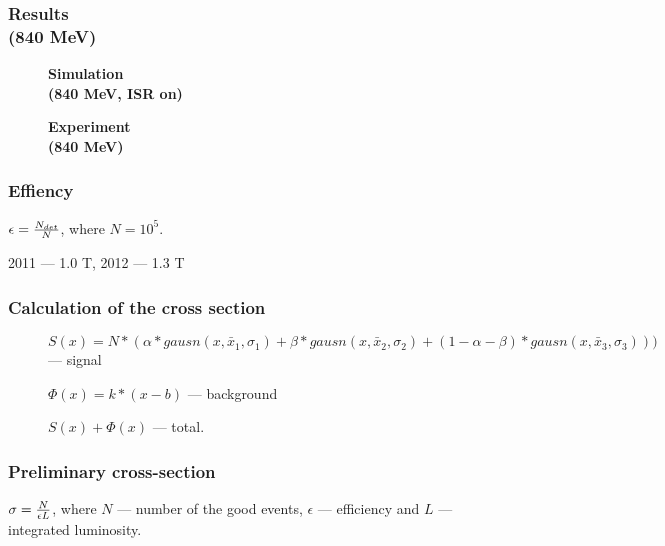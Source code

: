 \documentclass[14pt, hyperref = {colorlinks}]{beamer}
\begin{document}
\begin{frame}
\frametitle{Results\\(840 MeV)}
\begin{figure}[h]
  \begin{minipage}[h]{0.49\linewidth}
    \center\textbf{Simulation \\(840 MeV, ISR on)}
  \end{minipage}
  \hfill
  \begin{minipage}[h]{0.49\linewidth}
    \center\textbf{Experiment \\(840 MeV)}
  \end{minipage}
\end{figure}
\end{frame}

\begin{frame}
\frametitle{Effiency}
\center $\epsilon = {N_{det}\over{N}}$, where $N=10^{5}$.

2011 --- 1.0 T, 2012 --- 1.3 T
\begin{figure}[h]
\end{figure}
\end{frame}

\begin{frame}
\frametitle{Calculation of the cross section}
\begin{figure}[h]
    \begin{itemize}
    \tiny{
    \item $S(x) = N*(\alpha*gausn(x, \bar{x}_{1}, \sigma_{1}) + \beta*gausn(x, \bar{x}_{2}, \sigma_{2}) + (1-\alpha-\beta)*gausn(x, \bar{x}_{3}, \sigma_{3})))$ --- signal
    \item $\Phi(x) = k*(x-b)$ --- background
    \item $S(x) + \Phi(x)$ --- total. 
    }
    \end{itemize}
\end{figure}
\end{frame}

\begin{frame}
\frametitle{Preliminary cross-section}
\center $\sigma = {N\over{\epsilon L}}$, where $N$ --- number of the good events, $\epsilon$ --- efficiency and $L$ --- integrated luminosity.\\
\begin{figure}[h]
    \center\textbf{}
\end{figure}
\end{frame}
\end{document}
